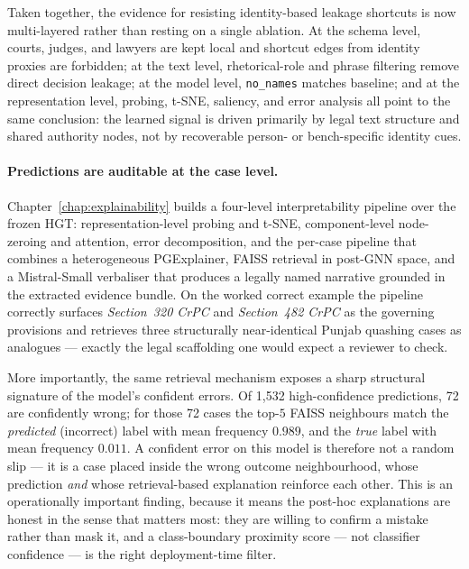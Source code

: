 {Taken together, the evidence for resisting identity-based
leakage shortcuts is now multi-layered rather than resting on a single
ablation. At the schema level, courts, judges, and lawyers are kept
local and shortcut edges from identity proxies are forbidden; at the
text level, rhetorical-role and phrase filtering remove direct decision
leakage; at the model level, \texttt{no\_names} matches baseline; and
at the representation level, probing, t-SNE, saliency, and error
analysis all point to the same conclusion: the learned signal is driven
primarily by legal text structure and shared authority nodes, not by
recoverable person- or bench-specific identity cues.\par}

\paragraph{Predictions are auditable at the case level.}
Chapter~\ref{chap:explainability} builds a four-level
interpretability pipeline over the frozen HGT: representation-level
probing and t-SNE, component-level node-zeroing and attention, error
decomposition, and the per-case
 pipeline that combines a heterogeneous
PGExplainer, FAISS retrieval in post-GNN space, and a Mistral-Small
verbaliser that produces a legally named narrative grounded in the
extracted evidence bundle.  On the worked correct example the
pipeline correctly surfaces \emph{Section~320 CrPC} and
\emph{Section~482 CrPC} as the governing provisions and retrieves
three structurally near-identical Punjab quashing cases as analogues
--- exactly the legal scaffolding one would expect a reviewer to
check.

{More importantly, the same retrieval mechanism exposes a
sharp structural signature of the model's confident errors.  Of
1{,}532 high-confidence predictions, 72 are confidently wrong; for
those 72 cases the top-$5$ FAISS neighbours match the \emph{predicted}
(incorrect) label with mean frequency $0.989$, and the \emph{true}
label with mean frequency $0.011$.  A confident error on this model
is therefore not a random slip --- it is a case placed inside the
wrong outcome neighbourhood, whose prediction \emph{and} whose
retrieval-based explanation reinforce each other.  This is an
operationally important finding, because it means the post-hoc
explanations are honest in the sense that matters most: they are
willing to confirm a mistake rather than mask it, and a
class-boundary proximity score --- not classifier confidence ---
is the right deployment-time filter.\par}

